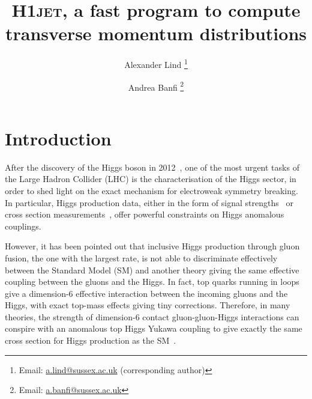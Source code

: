 \documentclass[12pt]{article}
\title{\vspace{-10mm}\textsc{H1jet}, a fast program to compute transverse momentum distributions\blfootnote{\textsc{H1jet} can be obtained from ref.~\cite{h1jet}.}}
\author[1]{Alexander Lind \footnote{Email: \href{mailto:a.lind@sussex.ac.uk}{a.lind@sussex.ac.uk} (corresponding author)}}
\author[1]{Andrea Banfi \footnote{Email: \href{mailto:a.banfi@sussex.ac.uk}{a.banfi@sussex.ac.uk}}}
\affil[1]{Department of Physics and Astronomy, University of Sussex, BN1 9QH Brighton, UK}
\date{}
\begin{document}
\maketitle

\vspace{-10mm} 


\tableofcontents 

\newpage 

\section{Introduction}
\label{sec:intro}

After the discovery of the Higgs boson in
2012~\cite{Aad:2012tfa,Chatrchyan:2012ufa}, one of the most urgent tasks of
the Large Hadron Collider (LHC) is the characterisation of the Higgs
sector, in order to shed light on the exact mechanism for electroweak
symmetry breaking. In particular, Higgs production data, either in the
form of signal strengths~\cite{Aad:2019mbh,Sirunyan:2018koj} or cross
section measurements~\cite{Aaboud:2018ezd,Sirunyan:2018sgc}, offer
powerful constraints on Higgs anomalous couplings.

However, it has been pointed out that inclusive Higgs production
through gluon fusion, the one with the largest rate, is not able to
discriminate effectively between the Standard Model (SM) and another
theory giving the same effective coupling between the gluons and the
Higgs. In fact, top quarks running in loops give a dimension-6
effective interaction between the incoming gluons and the Higgs, with
exact top-mass effects giving tiny corrections. Therefore, in many
theories, the strength of dimension-6 contact gluon-gluon-Higgs
interactions can conspire with an anomalous top Higgs Yukawa coupling
to give exactly the same cross section for Higgs production as the
SM~\cite{Azatov:2013xha,Grojean:2013nya,Banfi:2013yoa}.
\end{document}
